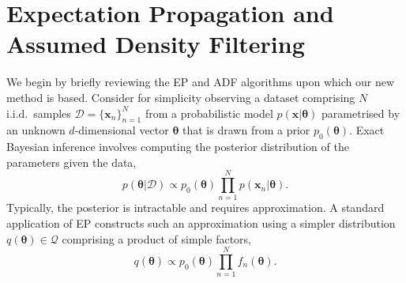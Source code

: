 

\section{Expectation Propagation and Assumed Density Filtering}
We begin by briefly reviewing the EP and ADF algorithms upon which our new method is based. Consider for simplicity observing a dataset comprising $N$ i.i.d.~samples $\mathcal{D} = \{\bm{x}_n \}_{n=1}^N$ from a probabilistic model $p(\bm{x}|\bm{\theta})$ parametrised by an unknown $d$-dimensional vector $\bm{\theta}$ that is drawn from a prior $p_0(\bm{\theta})$. Exact Bayesian inference involves computing the posterior distribution of the parameters given the data, 
\begin{equation}
p(\bm{\theta} | \mathcal{D}) \propto p_0(\bm{\theta}) \prod_{n=1}^{N} p(\bm{x}_n | \bm{\theta}).
\end{equation}
%
Typically, the posterior is intractable and requires approximation. A standard application of EP constructs such an approximation using a simpler distribution $q(\bm{\theta}) \in \mathcal{Q}$ comprising a product of simple factors,
%
%
\begin{equation}
q(\bm{\theta}) \propto p_0(\bm{\theta}) \prod_{n=1}^{N} f_n(\bm{\theta}).
\end{equation}
%
